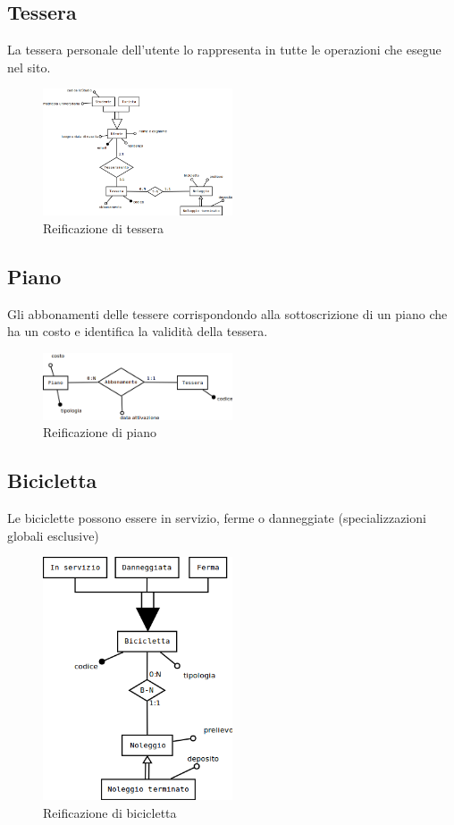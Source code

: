 \documentclass[a4paper,twoside]{article}
\begin{document}
\subsection{Tessera}
La tessera personale dell'utente lo rappresenta in tutte le operazioni che esegue nel sito.
\begin{figure}[H]
 \centering
  \includegraphics[width=0.5\textwidth]{Immagini-Grafici/Concettuale04.png}
\caption{Reificazione di tessera}
\end{figure}

\subsection{Piano}
Gli abbonamenti delle tessere corrispondondo alla sottoscrizione di un piano che ha un costo e identifica la validità della tessera.
\begin{figure}[H]
 \centering
  \includegraphics[width=0.5\textwidth]{Immagini-Grafici/Concettuale05.png}
\caption{Reificazione di piano}
\end{figure}

\subsection{Bicicletta}
Le biciclette possono essere in servizio, ferme o danneggiate (specializzazioni globali esclusive)
\begin{figure}[H]
 \centering
  \includegraphics[width=0.5\textwidth]{Immagini-Grafici/Concettuale06.png}
\caption{Reificazione di bicicletta}
\end{figure}
\end{document}
